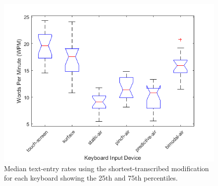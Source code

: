 \begin{figure}[t]
	\centering
	\includegraphics{Figures/fig_textentry_short_boxplot}
	\caption[Text-entry Rates Boxplot for Modified-shortest]{Median text-entry rates using the shortest-transcribed modification for each keyboard showing the 25th and 75th percentiles.}
	\label{fig_textentry_short_boxplot}
\end{figure}

